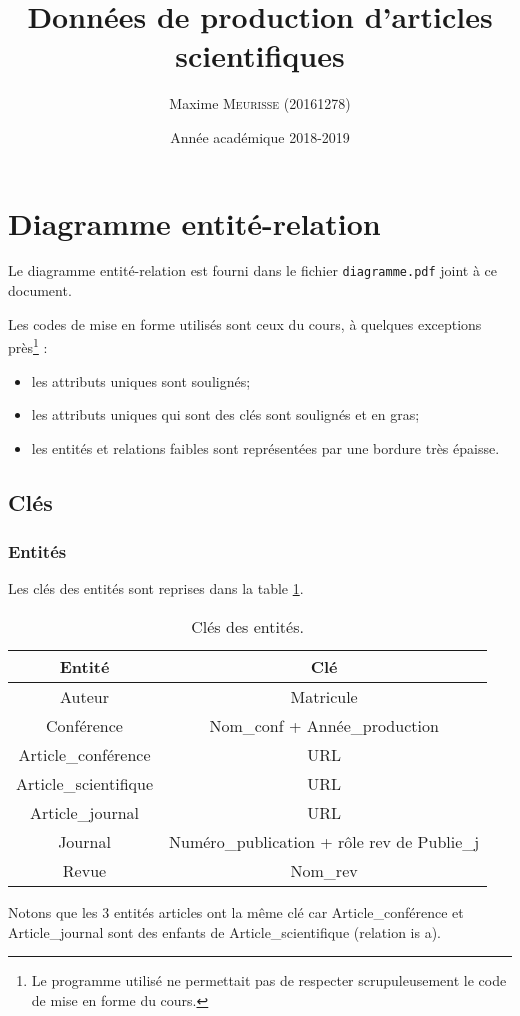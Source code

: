 \documentclass[a4paper, 12pt]{article}
\title{Données de production d'articles scientifiques}
\author{Maxime \textsc{Meurisse} (20161278)\\}
\date{Année académique 2018-2019}
\begin{document}
	
	\section{Diagramme entité-relation}
	Le diagramme entité-relation est fourni dans le fichier \texttt{diagramme.pdf} joint à ce document.\par
	Les codes de mise en forme utilisés sont ceux du cours, à quelques exceptions près\footnote{Le programme utilisé ne permettait pas de respecter scrupuleusement le code de mise en forme du cours.} :
	\begin{itemize}
		\item les attributs uniques sont soulignés;
		\item les attributs uniques qui sont des clés sont soulignés et en gras;
		\item les entités et relations faibles sont représentées par une bordure très épaisse.
	\end{itemize}
	\subsection{Clés}
	\subsubsection{Entités}
	Les clés des entités sont reprises dans la table \ref{tab:cle_entites}.\par
	\begin{table}[!ht]
		\centering
		\begin{tabular}{|c|c|}
			\hline
			{\bf Entité} & {\bf Clé}\\ \hline
			\hline
			Auteur & Matricule\\ \hline
			Conférence & Nom\_conf + Année\_production\\ \hline
			Article\_conférence & URL\\ \hline
			Article\_scientifique & URL\\ \hline
			Article\_journal & URL\\ \hline
			Journal & Numéro\_publication + rôle \og rev\fg{} de Publie\_j\\ \hline
			Revue & Nom\_rev\\ \hline
		\end{tabular}
		\caption{Clés des entités.}
		\label{tab:cle_entites}
	\end{table}
	Notons que les 3 entités articles ont la même clé car Article\_conférence et Article\_journal sont des enfants de Article\_scientifique (relation \og is a\fg{}).
\end{document}
